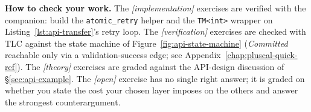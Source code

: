 \textbf{How to check your work.} The \emph{[implementation]} exercises are
verified with the companion: build the \texttt{atomic\_retry} helper and the
\texttt{TM<int>} wrapper on Listing~\ref{lst:api-transfer}'s retry loop.  The
\emph{[verification]} exercises are checked with TLC against the state
machine of Figure~\ref{fig:api-state-machine} (\emph{Committed} reachable only
via a validation-success edge; see Appendix~\ref{chap:pluscal-quick-ref}).
The \emph{[theory]} exercises are graded against the API-design discussion of
\S\ref{sec:api-example}.  The \emph{[open]} exercise has no single right
answer; it is graded on whether you state the cost your chosen layer
imposes on the others and answer the strongest counterargument.

